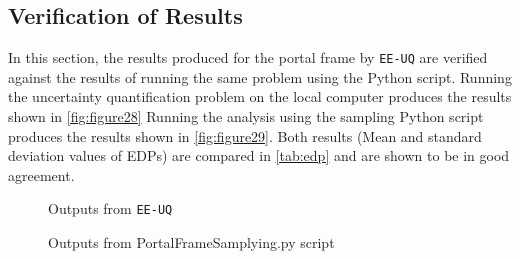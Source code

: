 \subsection{Verification of Results}
In this section, the results produced for the portal frame
by \texttt{EE-UQ} are verified against the results of running the same
problem using the Python script.  Running the uncertainty
quantification problem on the local computer produces the results
shown in \autoref{fig:figure28} Running the analysis using the
sampling Python script produces the results shown
in \autoref{fig:figure29}.  Both results (Mean and standard deviation
values of EDPs) are compared in \autoref{tab:edp} and are shown to be in good
agreement.

\begin{figure}[!htbp]
  \caption{Outputs from \texttt{EE-UQ}}
  \label{fig:figure28}
\end{figure}


\begin{figure}[!htbp]
  \caption{Outputs from PortalFrameSamplying.py script}
  \label{fig:figure29}
\end{figure}




